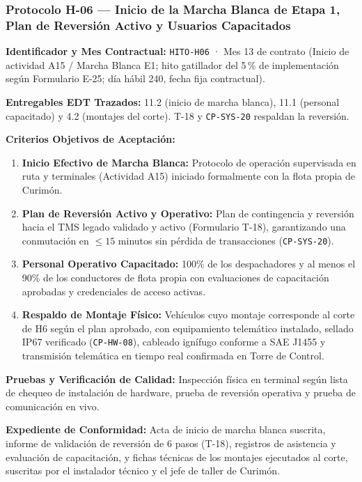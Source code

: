 \subsubsection*{Protocolo H-06 — Inicio de la Marcha Blanca de Etapa 1, Plan de Reversión Activo y Usuarios Capacitados}\label{sec:9-proto-h6}
\par\noindent\textbf{Identificador y Mes Contractual:} \texttt{HITO-H06} · Mes 13 de contrato (Inicio de actividad A15 / Marcha Blanca E1; hito gatillador del 5\,\% de implementación según Formulario E-25; día hábil 240, fecha fija contractual).\par
\par\noindent\textbf{Entregables EDT Trazados:} 11.2 (inicio de marcha blanca), 11.1 (personal capacitado) y 4.2 (montajes del corte). T-18 y \texttt{CP-SYS-20} respaldan la reversión.\par
\par\noindent\textbf{Criterios Objetivos de Aceptación:}
\begin{enumerate}
  \item \textbf{Inicio Efectivo de Marcha Blanca:} Protocolo de operación supervisada en ruta y terminales (Actividad A15) iniciado formalmente con la flota propia de Curimón.
  \item \textbf{Plan de Reversión Activo y Operativo:} Plan de contingencia y reversión hacia el TMS legado validado y activo (Formulario T-18), garantizando una conmutación en $\le 15$ minutos sin pérdida de transacciones (\texttt{CP-SYS-20}).
  \item \textbf{Personal Operativo Capacitado:} 100\% de los despachadores y al menos el 90\% de los conductores de flota propia con evaluaciones de capacitación aprobadas y credenciales de acceso activas.
  \item \textbf{Respaldo de Montaje Físico:} Vehículos cuyo montaje corresponde al corte de H6 según el plan aprobado, con equipamiento telemático instalado, sellado IP67 verificado (\texttt{CP-HW-08}), cableado ignífugo conforme a SAE J1455 y transmisión telemática en tiempo real confirmada en Torre de Control.
\end{enumerate}
\par\noindent\textbf{Pruebas y Verificación de Calidad:} Inspección física en terminal según lista de chequeo de instalación de hardware, prueba de reversión operativa y prueba de comunicación en vivo.\par
\par\noindent\textbf{Expediente de Conformidad:} Acta de inicio de marcha blanca suscrita, informe de validación de reversión de 6 pasos (T-18), registros de asistencia y evaluación de capacitación, y fichas técnicas de los montajes ejecutados al corte, suscritas por el instalador técnico y el jefe de taller de Curimón.\par
